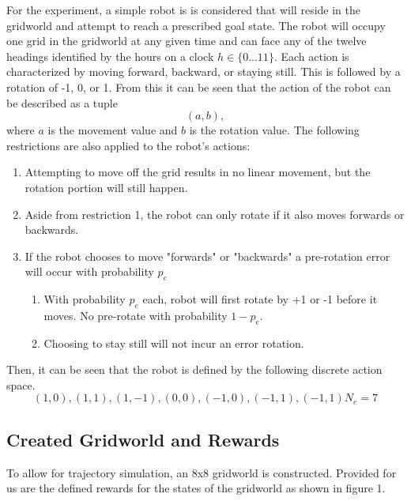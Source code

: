 \documentclass[fullpage]{article}
\begin{document}
For the experiment, a simple robot is is considered that will reside in the gridworld and attempt to reach a prescribed goal state. The robot will occupy one grid in the gridworld at any given time and can face any of the twelve headings identified by the hours on a clock $h \in \{0...11\}$. Each action is characterized by moving forward, backward, or staying still. This is followed by a rotation of -1, 0, or 1. From this it can be seen that the action of the robot can be described as a tuple
\[
(a, b),
\]
where $a$ is the movement value and $b$ is the rotation value.
The following restrictions are also applied to the robot's actions:
\begin{enumerate}
\item Attempting to move off the grid results in no linear movement, but the rotation portion will still happen.
\item Aside from restriction 1, the robot can only rotate if it also moves forwards or backwards.
\item If the robot chooses to move "forwards" or "backwards" a pre-rotation error will occur with probability $p_e$
\begin{enumerate}
\item With probability $p_e$ each, robot will first rotate by +1 or -1 before it moves. No pre-rotate with probability $1-p_e$.
\item Choosing to stay still will not incur an error rotation.
\end{enumerate}
\end{enumerate}

Then, it can be seen that the robot is defined by the following discrete action space.
\[
(1, 0), (1, 1), (1,-1), (0,0), (-1,0), (-1,1), (-1,1)
             N_e = 7
\]

\subsection{Created Gridworld and Rewards}
To allow for trajectory simulation, an 8x8 gridworld is constructed. Provided for us are the defined rewards for the states of the gridworld as shown in figure 1.
\end{document}
